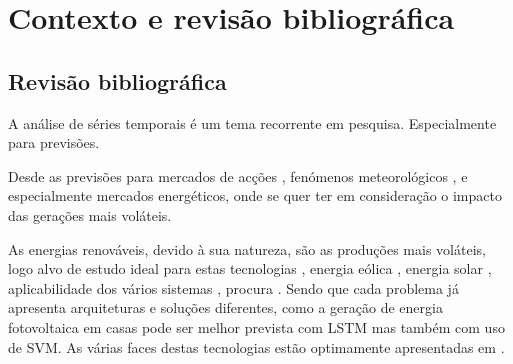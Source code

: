 \chapter{Contexto e revisão bibliográfica}
\section{Revisão bibliográfica}

A análise de séries temporais é um tema recorrente em pesquisa. Especialmente para previsões.\par
Desde as previsões para mercados de acções \cite{Bhandari2022}, fenómenos meteorológicos \cite{Wang2019}, e especialmente mercados energéticos, onde se quer ter em consideração o impacto das gerações mais voláteis.\par
As energias renováveis, devido à sua natureza, são as produções mais voláteis, logo alvo de estudo ideal para estas tecnologias \cite{Lu2015}, energia eólica \cite{Sun2022}, energia solar \cite{Rajasundrapandiyanleebanon2023}, aplicabilidade dos vários sistemas \cite{Ahmad2020}, procura \cite{Antonopoulos2020}.
Sendo que cada problema já apresenta arquiteturas e soluções diferentes, como a geração de energia fotovoltaica em casas pode ser melhor prevista com \gls{LSTM}\cite{Costa2022} mas também com uso de \gls{SVM}\cite{Meenal2018}. As várias faces destas tecnologias estão optimamente apresentadas em \cite{Benti2023}.\par



